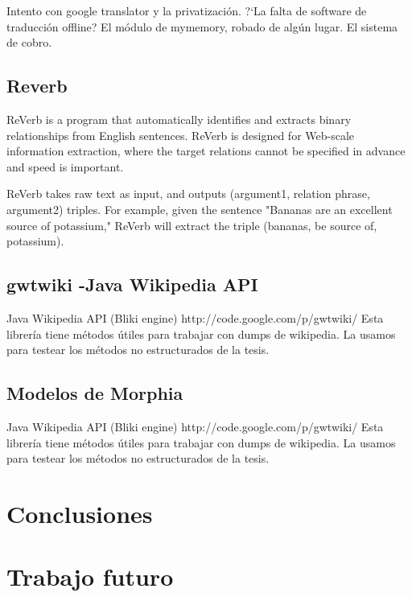 Intento con google translator y la privatización. ?`La falta de
software de traducción offline? El módulo de mymemory, robado de
algún lugar. El sistema de cobro. 

\subsection{Reverb}

ReVerb is a program that automatically identifies and extracts binary relationships from English sentences. ReVerb is designed for Web-scale information extraction, where the target relations cannot be specified in advance and speed is important.

ReVerb takes raw text as input, and outputs (argument1, relation phrase, argument2) triples. For example, given the sentence "Bananas are an excellent source of potassium," ReVerb will extract the triple (bananas, be source of, potassium).

\subsection{gwtwiki -Java Wikipedia API}\label{sec:gwtwiki}

Java Wikipedia API (Bliki engine)
http://code.google.com/p/gwtwiki/
Esta librería tiene métodos útiles para trabajar con dumps de wikipedia. La usamos para testear los métodos no estructurados de la tesis.


\subsection{Modelos de Morphia}\label{sec:modelos-morphia}

Java Wikipedia API (Bliki engine)
http://code.google.com/p/gwtwiki/
Esta librería tiene métodos útiles para trabajar con dumps de wikipedia. La usamos para testear los métodos no estructurados de la tesis.



\section{Conclusiones}
\section{Trabajo futuro}


